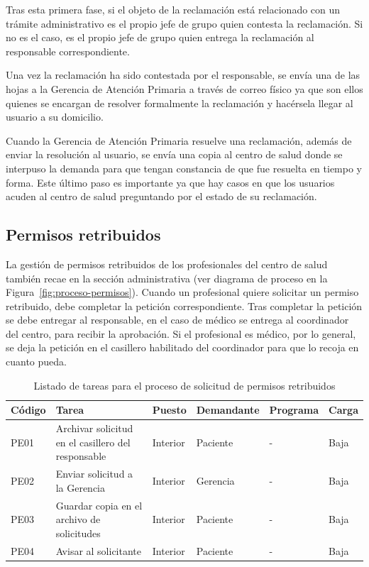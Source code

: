 Tras esta primera fase, si el objeto de la reclamación está relacionado con un trámite administrativo es el propio jefe de grupo quien contesta la reclamación.
Si no es el caso, es el propio jefe de grupo quien entrega la reclamación al responsable correspondiente.

Una vez la reclamación ha sido contestada por el responsable, se envía una de las hojas a la Gerencia de Atención Primaria a través de correo físico ya que son ellos quienes se encargan de resolver formalmente la reclamación y hacérsela llegar al usuario a su domicilio.

Cuando la Gerencia de Atención Primaria resuelve una reclamación, además de enviar la resolución al usuario, se envía una copia al centro de salud donde se interpuso la demanda para que tengan constancia de que fue resuelta en tiempo y forma.
Este último paso es importante ya que hay casos en que los usuarios acuden al centro de salud preguntando por el estado de su reclamación.

\subsection{Permisos retribuidos}

La gestión de permisos retribuidos de los profesionales del centro de salud también recae en la sección administrativa (ver diagrama de proceso en la Figura~\ref{fig:proceso-permisos}).
Cuando un profesional quiere solicitar un permiso retribuido, debe completar la petición correspondiente.
Tras completar la petición se debe entregar al responsable, en el caso de médico se entrega al coordinador del centro, para recibir la aprobación.
Si el profesional es médico, por lo general, se deja la petición en el casillero habilitado del coordinador para que lo recoja en cuanto pueda.

\begin{table}[H]
    \begin{tabular}{lp{5cm}llll}
        \toprule
        Código & Tarea                                              & Puesto   & Demandante & Programa & Carga \\
        \midrule
        PE01   & Archivar solicitud en el casillero del responsable & Interior & Paciente   & -        & Baja  \\
        PE02   & Enviar solicitud a la Gerencia                     & Interior & Gerencia   & -        & Baja  \\
        PE03   & Guardar copia en el archivo de solicitudes         & Interior & Paciente   & -        & Baja  \\
        PE04   & Avisar al solicitante                              & Interior & Paciente   & -        & Baja  \\
        \bottomrule
    \end{tabular}
    \caption{Listado de tareas para el proceso de solicitud de permisos retribuidos}
    \label{tab:proceso-permisos}
\end{table}


